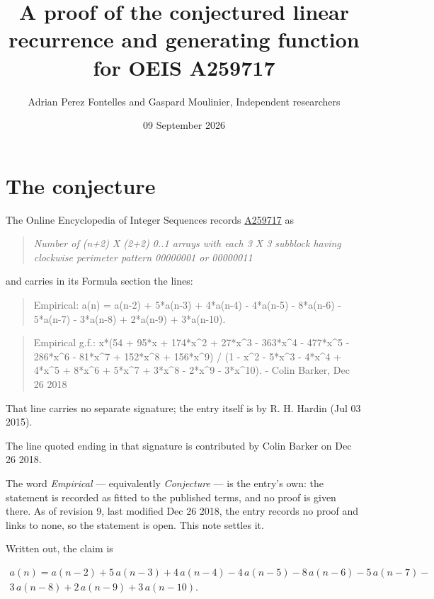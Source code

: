 \documentclass[11pt]{article}
\title{A proof of the conjectured linear recurrence and generating function for OEIS A259717}
\author{Adrian Perez Fontelles and Gaspard Moulinier, Independent researchers}
\date{09 September 2026}
\theoremstyle{definition}
\begin{document}
\maketitle
\section{The conjecture}

The Online Encyclopedia of Integer Sequences records \href{https://oeis.org/A259717}{A259717} as

\begin{quote}\itshape Number of (n+2) X (2+2) 0..1 arrays with each 3 X 3 subblock having clockwise perimeter pattern 00000001 or 00000011\end{quote}

and carries in its Formula section the lines:

\begin{quote}\ttfamily Empirical: a(n) = a(n-2) + 5*a(n-3) + 4*a(n-4) - 4*a(n-5) - 8*a(n-6) - 5*a(n-7) - 3*a(n-8) + 2*a(n-9) + 3*a(n-10).\end{quote}

\begin{quote}\ttfamily Empirical g.f.: x*(54 + 95*x + 174*x\textasciicircum{}2 + 27*x\textasciicircum{}3 - 363*x\textasciicircum{}4 - 477*x\textasciicircum{}5 - 286*x\textasciicircum{}6 - 81*x\textasciicircum{}7 + 152*x\textasciicircum{}8 + 156*x\textasciicircum{}9) / (1 - x\textasciicircum{}2 - 5*x\textasciicircum{}3 - 4*x\textasciicircum{}4 + 4*x\textasciicircum{}5 + 8*x\textasciicircum{}6 + 5*x\textasciicircum{}7 + 3*x\textasciicircum{}8 - 2*x\textasciicircum{}9 - 3*x\textasciicircum{}10). - Colin Barker, Dec 26 2018\end{quote}

That line carries no separate signature; the entry itself is by R. H. Hardin (Jul 03 2015).

The line quoted ending in that signature is contributed by Colin Barker on Dec 26 2018.

The word {\itshape Empirical} --- equivalently {\itshape Conjecture} --- is the entry's own: the statement is recorded as fitted to the published terms, and no proof is given there. As of revision 9, last modified Dec 26 2018, the entry records no proof and links to none, so the statement is open. This note settles it.

Written out, the claim is

\begin{multline*} a(n) = a(n-2) + 5\,a(n-3) + 4\,a(n-4) - 4\,a(n-5) - 8\,a(n-6) - 5\,a(n-7) - \\ 3\,a(n-8) + 2\,a(n-9) + 3\,a(n-10). \end{multline*}
\end{document}
